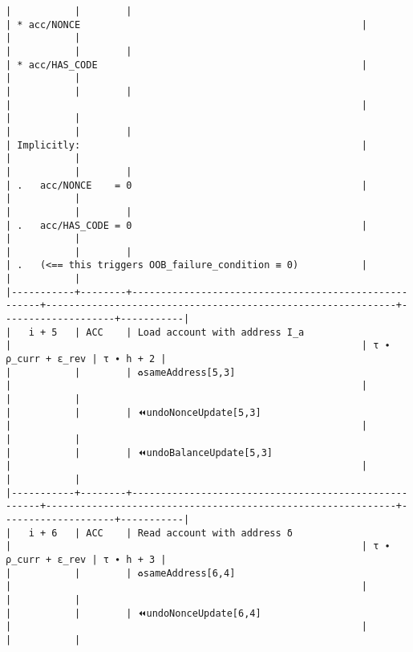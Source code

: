 \documentclass[varwidth=\maxdimen,margin=0.5cm,multi={verbatim}]{standalone}
\begin{document}
\begin{verbatim}
|           |        |                                                      | * acc/NONCE                                                 |                    |           |
|           |        |                                                      | * acc/HAS_CODE                                              |                    |           |
|           |        |                                                      |                                                             |                    |           |
|           |        |                                                      | Implicitly:                                                 |                    |           |
|           |        |                                                      | .   acc/NONCE    = 0                                        |                    |           |
|           |        |                                                      | .   acc/HAS_CODE = 0                                        |                    |           |
|           |        |                                                      | .   (<== this triggers OOB_failure_condition ≡ 0)           |                    |           |
|-----------+--------+------------------------------------------------------+-------------------------------------------------------------+--------------------+-----------|
|   i + 5   | ACC    | Load account with address I_a                        |                                                             | τ ∙ ρ_curr + ε_rev | τ ∙ h + 2 |
|           |        | ♻️sameAddress[5,3]                                   |                                                             |                    |           |
|           |        | ⏪undoNonceUpdate[5,3]                               |                                                             |                    |           |
|           |        | ⏪undoBalanceUpdate[5,3]                             |                                                             |                    |           |
|-----------+--------+------------------------------------------------------+-------------------------------------------------------------+--------------------+-----------|
|   i + 6   | ACC    | Read account with address δ                          |                                                             | τ ∙ ρ_curr + ε_rev | τ ∙ h + 3 |
|           |        | ♻️sameAddress[6,4]                                   |                                                             |                    |           |
|           |        | ⏪undoNonceUpdate[6,4]                               |                                                             |                    |           |

\end{verbatim}
\end{document}
